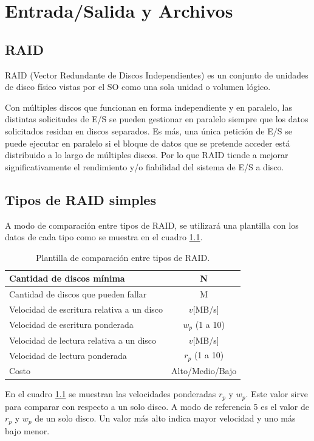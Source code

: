 \chapter{Entrada/Salida y Archivos}

\section{RAID}

RAID (Vector Redundante de Discos Independientes) es un conjunto de unidades de disco físico vistas por el SO como una sola unidad o volumen lógico.

Con múltiples discos que funcionan en forma independiente y en paralelo, las distintas solicitudes de E/S se pueden gestionar en paralelo siempre que los datos solicitados residan en discos separados. Es más, una única petición de E/S se puede ejecutar en paralelo si el bloque de datos que se pretende acceder está distribuido a lo largo de múltiples discos. Por lo que RAID tiende a mejorar significativamente el rendimiento y/o fiabilidad del sistema de E/S a disco.

\section{Tipos de RAID simples}

A modo de comparación entre tipos de RAID, se utilizará una plantilla con los datos de cada tipo como se muestra en el cuadro \ref{tab:template_raid}. 
\begin{table}[!ht]
  \centering
  \begin{tabular}{l|c}
    Cantidad de discos mínima & N \\\hline
    Cantidad de discos que pueden fallar & M \\ \hline
    Velocidad de escritura relativa a un disco & \(v\)[MB/s] \\\hline
    Velocidad de escritura ponderada & \(w_p\) (1 a 10) \\ \hline
    Velocidad de lectura relativa a un disco & \(v\)[MB/s] \\ \hline
    Velocidad de lectura ponderada & \(r_p\) (1 a 10) \\ \hline
    Costo & Alto/Medio/Bajo
  \end{tabular}
  \caption{Plantilla de comparación entre tipos de RAID.}
  \label{tab:template_raid}
\end{table}

En el cuadro \ref{tab:template_raid} se muestran las velocidades ponderadas \(r_p\) y \(w_p\). Este valor sirve para comparar con respecto a un solo disco. A modo de referencia 5 es el valor de \(r_p\) y \(w_p\) de un solo disco. Un valor más alto indica mayor velocidad y uno más bajo menor.

